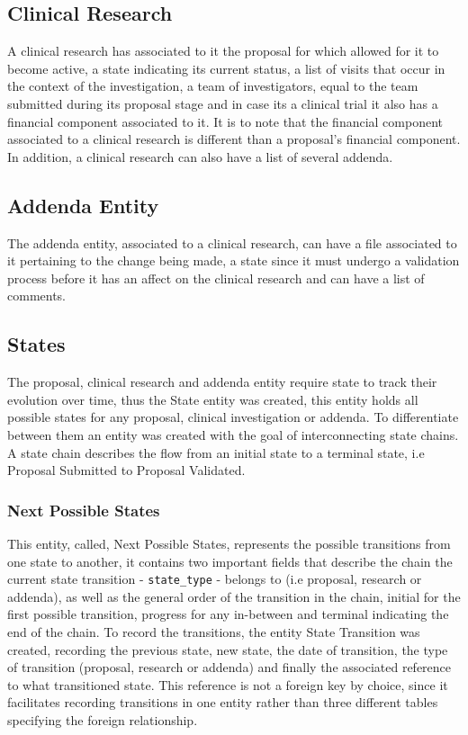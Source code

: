 \subsection{Clinical Research}
A clinical research has associated to it the proposal for which allowed for it to become active, a state indicating its current status, a list of visits that occur in the context of the investigation, a team of investigators, equal to the team submitted during its proposal stage and in case its a clinical trial it also has a financial component associated to it. It is to note that the financial component associated to a clinical research is different than a proposal's financial component. In addition, a clinical research can also have a list of several addenda.



\subsection{Addenda Entity}\label{subsec:addenda-entity}
The addenda entity, associated to a clinical research, can have a file associated to it pertaining to the change being made, a state since it must undergo a validation process before it has an affect on the clinical research and can have a list of comments.


\subsection{States}\label{subsec:states-entity}
The proposal, clinical research and addenda entity require state to track their evolution over time, thus the State entity was created, this entity holds all possible states for any proposal, clinical investigation or addenda. To differentiate between them an entity was created with the goal of interconnecting state chains. A state chain describes the flow from an initial state to a terminal state, i.e Proposal Submitted to Proposal Validated. 


\subsubsection{Next Possible States}\label{subsubsec:next-possible-states-entity}
This entity, called, Next Possible States, represents the possible transitions from one state to another, it contains two important fields that describe the chain the current state transition - \texttt{state\_type} - belongs to (i.e proposal, research or addenda), as well as the general order of the transition in the chain, initial for the first possible transition, progress for any in-between and terminal indicating the end of the chain.
To record the transitions, the entity State Transition was created, recording the previous state, new state, the date of transition, the type of transition (proposal, research or addenda) and finally the associated reference to what transitioned state. This reference is not a foreign key by choice, since it facilitates recording transitions in one entity rather than three different tables specifying the foreign relationship.


